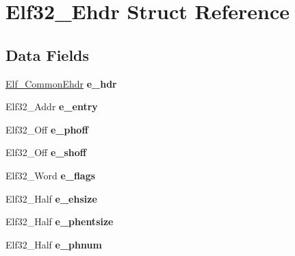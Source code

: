 \hypertarget{structElf32__Ehdr}{}\section{Elf32\+\_\+\+Ehdr Struct Reference}
\label{structElf32__Ehdr}
\subsection*{Data Fields}
\begin{DoxyCompactItemize}
\item 
\hyperlink{structElf__CommonEhdr}{Elf\+\_\+\+Common\+Ehdr} {\bfseries e\+\_\+hdr}\hypertarget{structElf32__Ehdr_a15e3cdf5b96bd1b6c794a6eb72364ab3}{}\label{structElf32__Ehdr_a15e3cdf5b96bd1b6c794a6eb72364ab3}

\item 
Elf32\+\_\+\+Addr {\bfseries e\+\_\+entry}\hypertarget{structElf32__Ehdr_ab8a982696048d807017919b7d0145482}{}\label{structElf32__Ehdr_ab8a982696048d807017919b7d0145482}

\item 
Elf32\+\_\+\+Off {\bfseries e\+\_\+phoff}\hypertarget{structElf32__Ehdr_a25c36fc010284a928604aae005b67ad1}{}\label{structElf32__Ehdr_a25c36fc010284a928604aae005b67ad1}

\item 
Elf32\+\_\+\+Off {\bfseries e\+\_\+shoff}\hypertarget{structElf32__Ehdr_a00601af5187a1b3f8babfe9cddd95c15}{}\label{structElf32__Ehdr_a00601af5187a1b3f8babfe9cddd95c15}

\item 
Elf32\+\_\+\+Word {\bfseries e\+\_\+flags}\hypertarget{structElf32__Ehdr_a87cf481be7917fafde0c4ecf78c8e574}{}\label{structElf32__Ehdr_a87cf481be7917fafde0c4ecf78c8e574}

\item 
Elf32\+\_\+\+Half {\bfseries e\+\_\+ehsize}\hypertarget{structElf32__Ehdr_a04c658023e50479eed64f6d1b00a2504}{}\label{structElf32__Ehdr_a04c658023e50479eed64f6d1b00a2504}

\item 
Elf32\+\_\+\+Half {\bfseries e\+\_\+phentsize}\hypertarget{structElf32__Ehdr_afa2289f96d86fcc568a3b1f40cc8953e}{}\label{structElf32__Ehdr_afa2289f96d86fcc568a3b1f40cc8953e}

\item 
Elf32\+\_\+\+Half {\bfseries e\+\_\+phnum}\hypertarget{structElf32__Ehdr_a360898812db1655f8cb8258780d9df5b}{}\label{structElf32__Ehdr_a360898812db1655f8cb8258780d9df5b}


\end{DoxyCompactItemize}
